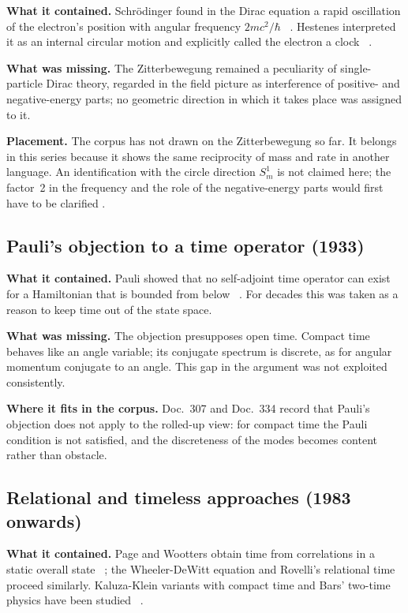 \textbf{What it contained.} Schrödinger found in the Dirac equation a rapid oscillation of the
electron's position with angular frequency $2mc^2/\hbar$ \QM~\cite{Schroedinger1930}. Hestenes
interpreted it as an internal circular motion and explicitly called the electron a clock
\QM~\cite{Hestenes1990}.

\textbf{What was missing.} The Zitterbewegung remained a peculiarity of single-particle Dirac
theory, regarded in the field picture as interference of positive- and negative-energy parts; no
geometric direction in which it takes place was assigned to it.

\textbf{Placement.} The corpus has not drawn on the Zitterbewegung so far. It belongs in this
series because it shows the same reciprocity of mass and rate in another language. An
identification with the circle direction $S^1_m$ is not claimed here; the factor~2 in the frequency
and the role of the negative-energy parts would first have to be clarified \SM.

\subsection{Pauli's objection to a time operator (1933)}

\textbf{What it contained.} Pauli showed that no self-adjoint time operator can exist for a
Hamiltonian that is bounded from below \QM~\cite{Pauli1933}. For decades this was taken as a reason
to keep time out of the state space.

\textbf{What was missing.} The objection presupposes open time. Compact time behaves like an angle
variable; its conjugate spectrum is discrete, as for angular momentum conjugate to an angle. This
gap in the argument was not exploited consistently.

\textbf{Where it fits in the corpus.} Doc.~307 and Doc.~334 record that Pauli's objection does not
apply to the rolled-up view: for compact time the Pauli condition is not satisfied, and the
discreteness of the modes becomes content rather than obstacle.

\subsection{Relational and timeless approaches (1983 onwards)}

\textbf{What it contained.} Page and Wootters obtain time from correlations in a static overall
state \QM~\cite{PageWootters1983}; the Wheeler-DeWitt equation and Rovelli's relational time
proceed similarly. Kaluza-Klein variants with compact time and Bars' two-time physics have been
studied \QM~\cite{Bars2001}.

